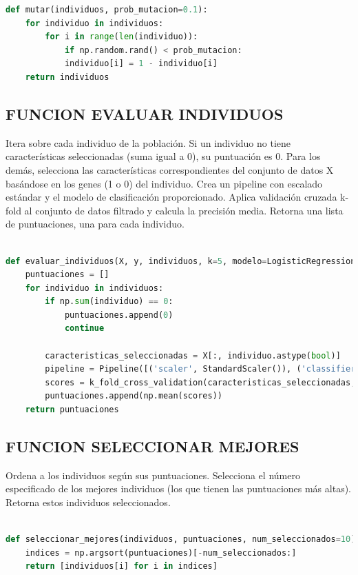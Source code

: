\documentclass[12pt]{article}
\begin{document}
\begin{lstlisting}[language=Python]
def mutar(individuos, prob_mutacion=0.1):
	for individuo in individuos:
		for i in range(len(individuo)):
			if np.random.rand() < prob_mutacion:
			individuo[i] = 1 - individuo[i]
	return individuos
\end{lstlisting}


\subsection*{FUNCION EVALUAR INDIVIDUOS}

Itera sobre cada individuo de la población. Si un individuo no tiene características seleccionadas (suma igual a 0), su puntuación es 0. Para los demás, selecciona las características correspondientes del conjunto de datos X basándose en los genes (1 o 0) del individuo. Crea un pipeline con escalado estándar y el modelo de clasificación proporcionado. Aplica validación cruzada k-fold al conjunto de datos filtrado y calcula la precisión media. Retorna una lista de puntuaciones, una para cada individuo. \vspace{1cm}

\begin{lstlisting}[language=Python]

def evaluar_individuos(X, y, individuos, k=5, modelo=LogisticRegression()):
	puntuaciones = []
	for individuo in individuos:
		if np.sum(individuo) == 0:
			puntuaciones.append(0)
			continue
	
		caracteristicas_seleccionadas = X[:, individuo.astype(bool)]
		pipeline = Pipeline([('scaler', StandardScaler()), ('classifier', modelo)])
		scores = k_fold_cross_validation(caracteristicas_seleccionadas, y, k, pipeline)
		puntuaciones.append(np.mean(scores))
	return puntuaciones

\end{lstlisting}


\subsection*{FUNCION SELECCIONAR MEJORES}

Ordena a los individuos según sus puntuaciones. Selecciona el número especificado de los mejores individuos (los que tienen las puntuaciones más altas). Retorna estos individuos seleccionados. \vspace{1cm}

\begin{lstlisting}[language=Python]
	
def seleccionar_mejores(individuos, puntuaciones, num_seleccionados=10):
	indices = np.argsort(puntuaciones)[-num_seleccionados:]
	return [individuos[i] for i in indices]
	
\end{lstlisting}
\end{document}
